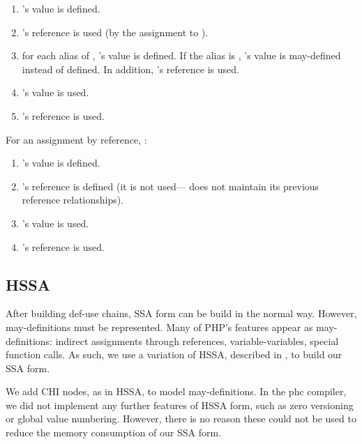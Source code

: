\begin{enumerate}

	\item
		's value is defined.

	\item
		's reference is used (by the assignment to ).

	\item
		for each alias  of , 's value is defined.
		If the alias is , 's value is may-defined instead of defined.
		In addition, 's reference is used.

	\item
		's value is used.

	\item
		's reference is used.

\end{enumerate}

For an assignment by reference, :

\begin{enumerate}

	\item
		's value is defined.

	\item
		's reference is defined (it is not used--- does not maintain its previous reference relationships).

	\item
		's value is used.

	\item
		's reference is used.

\end{enumerate}



\subsection{HSSA}

After building def-use chains, SSA form can be build in the normal way.
However, may-definitions must be represented.
Many of PHP's features appear as may-definitions: indirect assignments through references, variable-variables, special function calls.
As such, we use a variation of HSSA, described in , to build our SSA form.

We add CHI nodes, as in HSSA, to model may-definitions.
In the phc compiler, we did not implement any further features of HSSA form, such as zero versioning or global value numbering.
However, there is no reason these could not be used to reduce the memory consumption of our SSA form.

